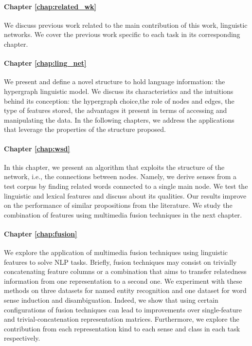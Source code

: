 \paragraph{Chapter \ref{chap:related_wk}} We discuss previous work related to the main contribution of this work, linguistic networks. We cover the previous work specific to each task in its corresponding chapter.

\paragraph{Chapter \ref{chap:ling_net}} We present and define a novel structure to hold language information: the hypergraph linguistic model.  We discuss its characteristics and the intuitions behind its conception: the hypergraph choice,the role of nodes and edges, the type of features stored, the advantages it present in terms of accessing and manipulating the data. In the following chapters, we address the applications that leverage the properties of the structure proposed.

\paragraph{Chapter \ref{chap:wsd}} In this chapter, we present an algorithm that exploits the structure of the network, i.e., the connections between nodes. Namely, we derive senses from a test corpus by finding related words connected to a single main node. We test the linguistic and lexical features and discuss about its qualities. Our results improve on the performance of similar propositions from the literature. We study the combination of features using multimedia fusion techniques in the next chapter.

\paragraph{Chapter \ref{chap:fusion}} We explore the application of multimedia fusion techniques using linguistic features to solve NLP tasks. Briefly, fusion techniques may consist on trivially concatenating feature columns or a combination that aims to transfer relatedness information from one representation to a second one. We experiment with these methods on three datasets for named entity recognition and one dataset for word sense induction and disambiguation. Indeed, we show that using certain configurations of fusion techniques can lead to improvements over single-feature and trivial-concatenation representation matrices. Furthermore, we explore the contribution from each representation kind to each sense and class in each task respectively.

